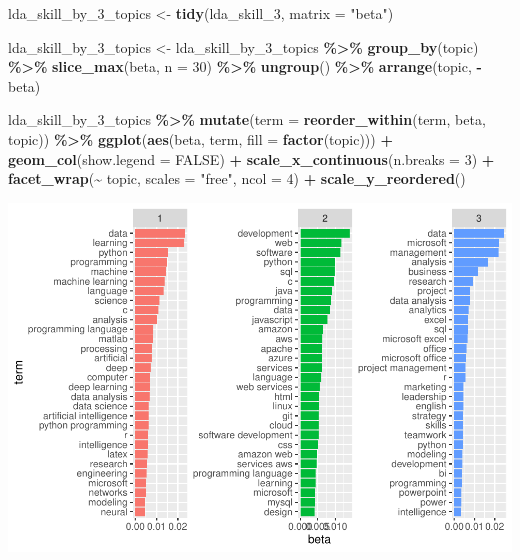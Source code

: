 \documentclass[11pt,]{article}
\newenvironment{Shaded}{\begin{snugshade}}{\end{snugshade}}
\newcommand{\AttributeTok}[1]{\textcolor[rgb]{0.13,0.29,0.53}{#1}}
\newcommand{\ConstantTok}[1]{\textcolor[rgb]{0.56,0.35,0.01}{#1}}
\newcommand{\DecValTok}[1]{\textcolor[rgb]{0.00,0.00,0.81}{#1}}
\newcommand{\FunctionTok}[1]{\textcolor[rgb]{0.13,0.29,0.53}{\textbf{#1}}}
\newcommand{\NormalTok}[1]{#1}
\newcommand{\OtherTok}[1]{\textcolor[rgb]{0.56,0.35,0.01}{#1}}
\newcommand{\SpecialCharTok}[1]{\textcolor[rgb]{0.81,0.36,0.00}{\textbf{#1}}}
\newcommand{\StringTok}[1]{\textcolor[rgb]{0.31,0.60,0.02}{#1}}
\begin{document}
\begin{Shaded}
\begin{Highlighting}[]
\NormalTok{lda\_skill\_by\_3\_topics }\OtherTok{\textless{}{-}} \FunctionTok{tidy}\NormalTok{(lda\_skill\_3, }\AttributeTok{matrix =} \StringTok{"beta"}\NormalTok{)}

\NormalTok{lda\_skill\_by\_3\_topics }\OtherTok{\textless{}{-}}\NormalTok{ lda\_skill\_by\_3\_topics }\SpecialCharTok{\%\textgreater{}\%} 
  \FunctionTok{group\_by}\NormalTok{(topic) }\SpecialCharTok{\%\textgreater{}\%} 
  \FunctionTok{slice\_max}\NormalTok{(beta, }\AttributeTok{n =} \DecValTok{30}\NormalTok{) }\SpecialCharTok{\%\textgreater{}\%} 
  \FunctionTok{ungroup}\NormalTok{() }\SpecialCharTok{\%\textgreater{}\%} 
  \FunctionTok{arrange}\NormalTok{(topic, }\SpecialCharTok{{-}}\NormalTok{beta)}

\NormalTok{lda\_skill\_by\_3\_topics }\SpecialCharTok{\%\textgreater{}\%} 
  \FunctionTok{mutate}\NormalTok{(}\AttributeTok{term =} \FunctionTok{reorder\_within}\NormalTok{(term, beta, topic)) }\SpecialCharTok{\%\textgreater{}\%} 
  \FunctionTok{ggplot}\NormalTok{(}\FunctionTok{aes}\NormalTok{(beta, term, }\AttributeTok{fill =} \FunctionTok{factor}\NormalTok{(topic))) }\SpecialCharTok{+}
  \FunctionTok{geom\_col}\NormalTok{(}\AttributeTok{show.legend =} \ConstantTok{FALSE}\NormalTok{) }\SpecialCharTok{+}
  \FunctionTok{scale\_x\_continuous}\NormalTok{(}\AttributeTok{n.breaks =} \DecValTok{3}\NormalTok{) }\SpecialCharTok{+}
  \FunctionTok{facet\_wrap}\NormalTok{(}\SpecialCharTok{\textasciitilde{}}\NormalTok{ topic, }\AttributeTok{scales =} \StringTok{"free"}\NormalTok{, }\AttributeTok{ncol =} \DecValTok{4}\NormalTok{) }\SpecialCharTok{+}
  \FunctionTok{scale\_y\_reordered}\NormalTok{()}
\end{Highlighting}
\end{Shaded}

\includegraphics{figs/skill-lda-3.pdf}
\end{document}
